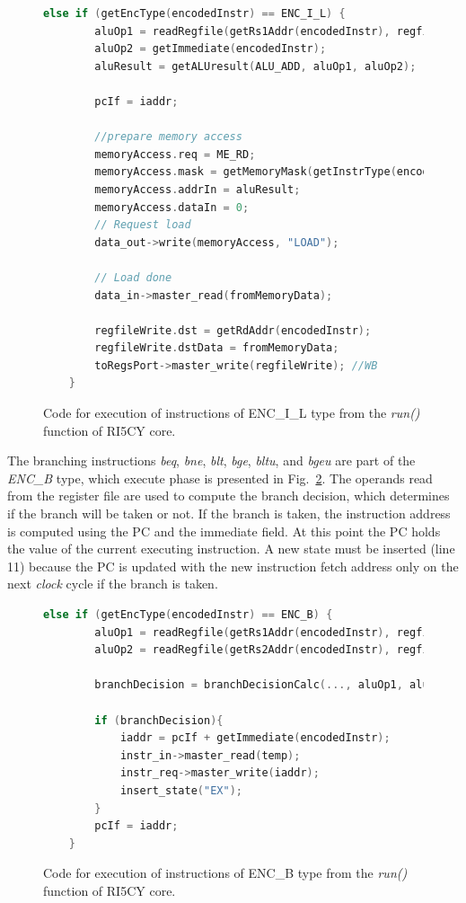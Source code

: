 \begin{figure}[htb!]
    \begin{lstlisting}[language=c++]
    else if (getEncType(encodedInstr) == ENC_I_L) {
        aluOp1 = readRegfile(getRs1Addr(encodedInstr), regfile);
        aluOp2 = getImmediate(encodedInstr);
        aluResult = getALUresult(ALU_ADD, aluOp1, aluOp2);
        
        pcIf = iaddr;
        
        //prepare memory access
        memoryAccess.req = ME_RD;
        memoryAccess.mask = getMemoryMask(getInstrType(encodedInstr));
        memoryAccess.addrIn = aluResult;
        memoryAccess.dataIn = 0;
        // Request load
        data_out->write(memoryAccess, "LOAD");
        
        // Load done
        data_in->master_read(fromMemoryData);
        
        regfileWrite.dst = getRdAddr(encodedInstr);
        regfileWrite.dstData = fromMemoryData;
        toRegsPort->master_write(regfileWrite); //WB
    }\end{lstlisting}
    \caption{Code for execution of instructions of ENC\_I\_L type from the \textit{run()} function of RI5CY core.}
    \label{fig:ri5cy-enc-i-l}
\end{figure}

The branching instructions \textit{beq}, \textit{bne}, \textit{blt}, \textit{bge}, \textit{bltu}, and \textit{bgeu} are part of the \textit{ENC\_B} type, which execute phase is presented in Fig.~\ref{fig:ri5cy-enc-b}. The operands read from the register file are used to compute the branch decision, which determines if the branch will be taken or not. If the branch is taken, the instruction address is computed using the PC and the immediate field. At this point the PC holds the value of the current executing instruction. A new state must be inserted (line 11) because the PC is updated with the new instruction fetch address only on the next \textit{clock} cycle if the branch is taken.

\begin{figure}[htb!]
    \begin{lstlisting}[language=c++]
    else if (getEncType(encodedInstr) == ENC_B) {
        aluOp1 = readRegfile(getRs1Addr(encodedInstr), regfile);
        aluOp2 = readRegfile(getRs2Addr(encodedInstr), regfile);
        
        branchDecision = branchDecisionCalc(..., aluOp1, aluOp2);
        
        if (branchDecision){
            iaddr = pcIf + getImmediate(encodedInstr);
            instr_in->master_read(temp);
            instr_req->master_write(iaddr);
            insert_state("EX");
        }
        pcIf = iaddr;
    } \end{lstlisting}
    \caption{Code for execution of instructions of ENC\_B type from the \textit{run()} function of RI5CY core.}
    \label{fig:ri5cy-enc-b}
\end{figure}

